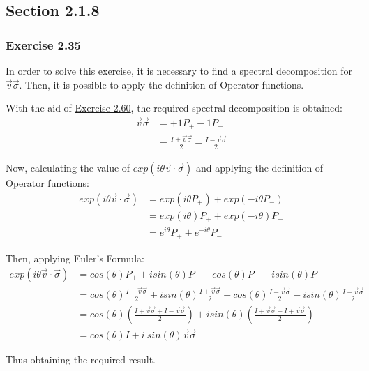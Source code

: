 \subsection{Section 2.1.8}
\subsubsection{Exercise 2.35}

In order to solve this exercise,
it is necessary to find a spectral decomposition for $\vec{v} \vec{\sigma}$.
Then, it is possible to apply the definition of Operator functions.

With the aid of \hyperref[sec:nielsen-and-chuang-exercise-2-60]{Exercise 2.60},
the required spectral decomposition is obtained:
\begin{align}
    \vec{v}\vec{\sigma} &= +1 P_+ -1 P_- \\
    &= \frac{I + \vec{v}\vec{\sigma}}{2} - \frac{I - \vec{v}\vec{\sigma}}{2}
\end{align}

Now, calculating the value of $exp(i \theta \vec{v}\cdot\vec{\sigma})$
and applying the definition of Operator functions:
\begin{align}
    exp(i \theta \vec{v}\cdot\vec{\sigma}) &=
        exp(i \theta P_+) + exp(-i \theta P_-) \\
    &= exp(i \theta) P_+ + exp(-i \theta) P_- \\
    &= e^{i \theta} P_+ + e^{-i \theta} P_-
\end{align}

Then, applying Euler's Formula:
\begin{align}
    exp(i \theta \vec{v}\cdot\vec{\sigma}) &=
        cos(\theta)P_+ + i sin(\theta)P_+ +
        cos(\theta)P_- - i sin(\theta)P_- \\
    &= cos(\theta)\frac{I + \vec{v}\vec{\sigma}}{2} +
        i sin(\theta)\frac{I + \vec{v}\vec{\sigma}}{2} +
        cos(\theta)\frac{I - \vec{v}\vec{\sigma}}{2} -
        i sin(\theta)\frac{I - \vec{v}\vec{\sigma}}{2} \\
    &= cos(\theta) \left(
            \frac{I + \vec{v}\vec{\sigma} + I - \vec{v}\vec{\sigma}}{2}
        \right)
        + i sin(\theta) \left(
            \frac{I + \vec{v}\vec{\sigma} - I + \vec{v}\vec{\sigma}}{2}
        \right) \\
    &= cos(\theta) I + i\ sin(\theta) \vec{v}\vec{\sigma}
\end{align}

Thus obtaining the required result.